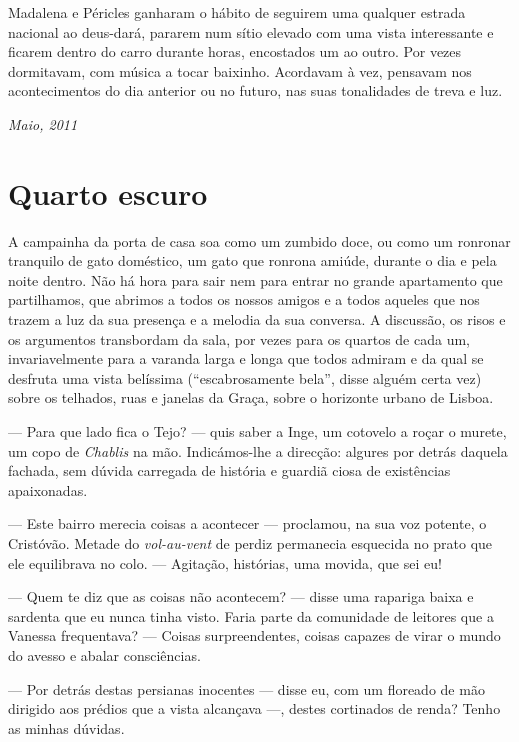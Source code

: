 Madalena e Péricles ganharam o hábito de seguirem uma qualquer estrada
nacional ao deus-dará, pararem num sítio elevado com uma vista
interessante e ficarem dentro do carro durante horas, encostados um ao
outro. Por vezes dormitavam, com música a tocar baixinho. Acordavam à
vez, pensavam nos acontecimentos do dia anterior ou no futuro, nas suas
tonalidades de treva e luz.

\begin{flushright}
\emph{Maio, 2011}
\end{flushright}


\chapter{Quarto escuro}

A campainha da porta de casa soa como um zumbido doce, ou como um ronronar
tranquilo de gato doméstico, um gato que ronrona amiúde, durante o dia e
pela noite dentro. Não há hora para sair nem para entrar no grande
apartamento que partilhamos, que abrimos a todos os nossos amigos e a
todos aqueles que nos trazem a luz da sua presença e a melodia da sua
conversa. A discussão, os risos e os argumentos transbordam da sala,
por vezes para os quartos de cada um, invariavelmente para a varanda
larga e longa que todos admiram e da qual se desfruta uma vista
belíssima (``escabrosamente bela'', disse alguém certa vez) sobre os
telhados, ruas e janelas da Graça, sobre o horizonte urbano de Lisboa.

--- Para que lado fica o Tejo? --- quis saber a Inge, um cotovelo a roçar
  o murete, um copo de \emph{Chablis }na mão. Indicámos-lhe a
  direcção: algures por detrás daquela fachada, sem dúvida carregada de
  história e guardiã ciosa de existências apaixonadas.

--- Este bairro merecia coisas a acontecer --- proclamou, na sua voz
  potente, o Cristóvão. Metade do \emph{vol-au-vent }de perdiz
  permanecia esquecida no prato que ele equilibrava no
colo. --- Agitação, histórias, uma movida, que sei eu!

--- Quem te diz que as coisas não acontecem? --- disse uma rapariga
baixa e sardenta que eu nunca tinha visto. Faria parte da comunidade de
leitores que a Vanessa frequentava? --- Coisas surpreendentes, coisas
capazes de virar o mundo do avesso e abalar consciências.

--- Por detrás destas persianas inocentes --- disse eu, com um floreado
de mão dirigido aos prédios que a vista alcançava ---, destes cortinados
de renda? Tenho as minhas dúvidas.

